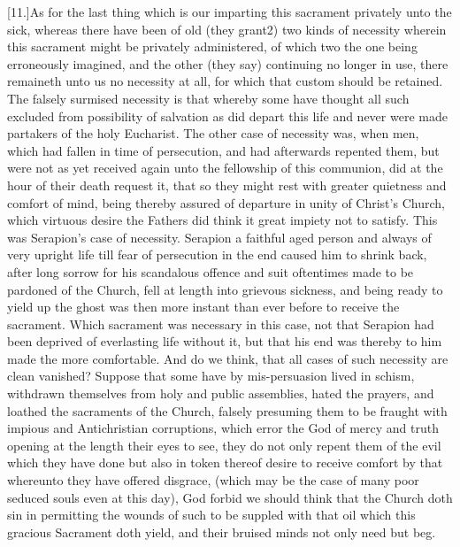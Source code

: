 [11.]As for the last thing which is our imparting this sacrament privately unto the sick, whereas there have been of old (they grant2) two kinds of necessity wherein this sacrament might be privately administered, of which two  the one being erroneously imagined, and the other (they say) continuing no longer in use, there remaineth unto us no necessity at all, for which that custom should be retained. The falsely surmised necessity is that whereby some have thought all such excluded from possibility of salvation as did depart this life and never were made partakers of the holy Eucharist. The other case of necessity was, when men, which had fallen in time of persecution, and had afterwards repented them, but were not as yet received again unto the fellowship of this communion, did at the hour of their death request it, that so they might rest with greater quietness and comfort of mind, being thereby assured of departure in unity of Christ’s Church, which virtuous desire the Fathers did think it great impiety not to satisfy. This was Serapion’s case of necessity. Serapion a faithful aged person and always of very upright life till fear of persecution in the end caused him to shrink back, after long sorrow for his scandalous offence and suit oftentimes made to be pardoned of the Church, fell at length into grievous sickness, and being ready to yield up the ghost was then more instant than ever before to receive the sacrament. Which sacrament was necessary in this case, not that Serapion had been deprived of everlasting life without it, but that his end was thereby to him made the more comfortable. And do we think, that all cases of such  necessity are clean vanished?
 Suppose that some have by mis-persuasion lived in schism, withdrawn themselves from holy and public assemblies, hated the prayers, and loathed the sacraments of the Church, falsely presuming them to be fraught with impious and Antichristian corruptions, which error the God of mercy and truth opening at the length their eyes to see, they do not only repent them of the evil which they have done but also in token thereof desire to receive comfort by that whereunto they have offered disgrace, (which may be the case of many poor seduced souls even at this day), God forbid we should think that the Church doth sin in permitting the wounds of such to be suppled with that oil which this gracious Sacrament doth yield, and their bruised minds not only need but beg.

